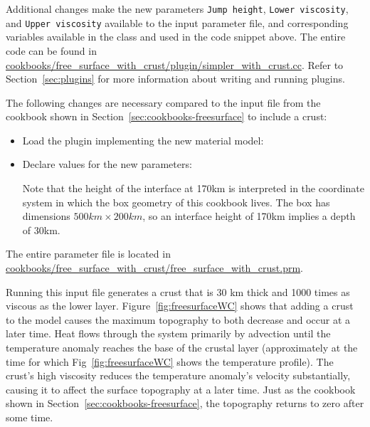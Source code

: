 Additional changes make the new parameters \texttt{Jump height}, \texttt{Lower
viscosity}, and \texttt{Upper viscosity} available to the input parameter file,
and corresponding variables available in the class and used in the code snippet
above. The entire code can be found in
\url{cookbooks/free_surface_with_crust/plugin/simpler_with_crust.cc}. Refer to
Section~\ref{sec:plugins} for more information about writing and running
plugins.

The following changes are necessary compared to the input file from the
cookbook shown in Section~\ref{sec:cookbooks-freesurface} to include a crust:
\begin{itemize}
  \item Load the plugin implementing the new material model:
  
  
  \item Declare values for the new parameters:
  
  Note that the height of the interface at 170km is interpreted in the
  coordinate system in which the box geometry of this cookbook lives. The box
  has dimensions $500\si{km}\times 200\si{km}$, so an interface height of
  170km implies a depth of 30km.
\end{itemize}

The entire parameter file is located in
\url{cookbooks/free_surface_with_crust/free_surface_with_crust.prm}.

Running this input file generates a
crust that is 30 km thick and 1000 times as viscous as the lower layer.
Figure~\ref{fig:freesurfaceWC} shows that adding a crust to the model causes the maximum topography to both decrease and occur at a later time.
Heat flows through the system primarily by advection until the temperature anomaly reaches the base of the
crustal layer (approximately at the time for which Fig~\ref{fig:freesurfaceWC}
shows the temperature profile).
The crust's high viscosity reduces the temperature anomaly's velocity
substantially, causing it to affect the surface topography at a later time. Just
as the cookbook shown in Section~\ref{sec:cookbooks-freesurface}, the
topography returns to zero after some time.

